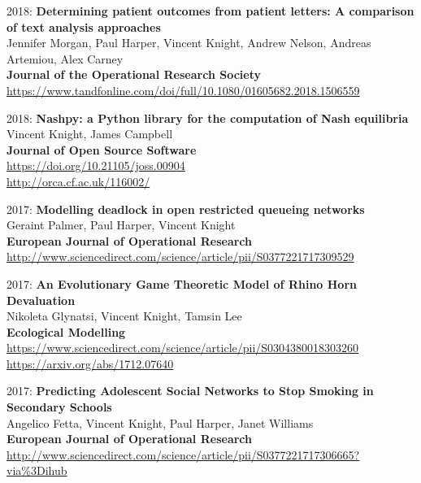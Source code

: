 \documentclass[10pt]{res} %
\begin{document}
\begin{resume}
\begin{etaremune}
\item
2018: \textbf{Determining patient outcomes from patient letters: A comparison of text analysis approaches}\\
Jennifer Morgan, Paul Harper, Vincent Knight, Andrew Nelson, Andreas Artemiou, Alex Carney
\\
\textbf{Journal of the Operational Research Society}
\\
\url{https://www.tandfonline.com/doi/full/10.1080/01605682.2018.1506559}
\\

\item
2018: \textbf{Nashpy: a Python library for the computation of Nash equilibria}\\
Vincent Knight, James Campbell
\\
\textbf{Journal of Open Source Software}
\\
\url{https://doi.org/10.21105/joss.00904}
\\
\url{http://orca.cf.ac.uk/116002/}
\\

\item
2017: \textbf{Modelling deadlock in open restricted queueing networks}\\
Geraint Palmer, Paul Harper, Vincent Knight
\\
\textbf{European Journal of Operational Research}
\\
\url{http://www.sciencedirect.com/science/article/pii/S0377221717309529}
\\

\item
2017: \textbf{An Evolutionary Game Theoretic Model of Rhino Horn Devaluation}\\
Nikoleta Glynatsi, Vincent Knight, Tamsin Lee
\\
\textbf{Ecological Modelling}
\\
\url{https://www.sciencedirect.com/science/article/pii/S0304380018303260}
\\
\url{https://arxiv.org/abs/1712.07640}
\\

\item
2017: \textbf{Predicting Adolescent Social Networks to Stop Smoking in Secondary Schools}\\
Angelico Fetta, Vincent Knight, Paul Harper, Janet Williams
\\
\textbf{European Journal of Operational Research}
\\
\url{http://www.sciencedirect.com/science/article/pii/S0377221717306665?via%3Dihub}
\\


\end{etaremune}
\end{resume}
\end{document}
